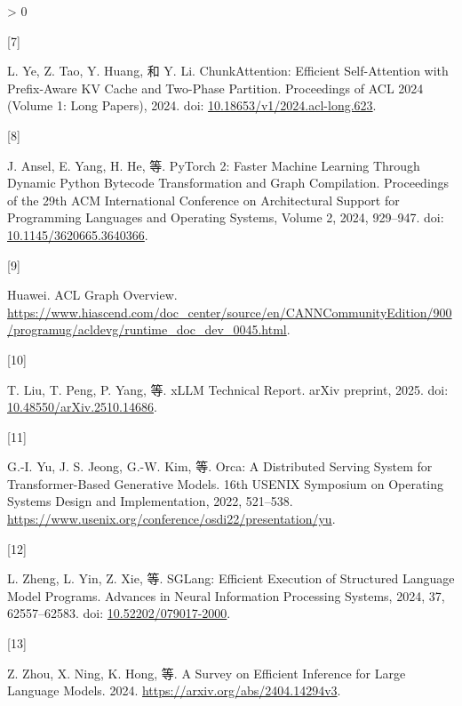 \documentclass[
  UTF8,
  zihao=5]{ctexart}
\newlength{\cslhangindent}
\newlength{\csllabelwidth}
\newenvironment{CSLReferences}[2] %
 {%
  \setlength{\parindent}{0pt}
  \ifodd #1 \everypar{\setlength{\hangindent}{\cslhangindent}}\ignorespaces\fi
  \ifnum #2 > 0
  \setlength{\parskip}{#2\baselineskip}
  \fi
 }%
 {}
\newcommand{\CSLLeftMargin}[1]{\parbox[t]{\csllabelwidth}{#1}}
\newcommand{\CSLRightInline}[1]{\parbox[t]{\linewidth - \csllabelwidth}{#1}\par}
\begin{document}
\begin{CSLReferences}{0}{0}
\leavevmode{}%
\CSLLeftMargin{{[}7{]} }%
\CSLRightInline{L. Ye, Z. Tao, Y. Huang, 和 Y. Li. ChunkAttention:
Efficient Self-Attention with Prefix-Aware KV Cache and Two-Phase
Partition. Proceedings of ACL 2024 (Volume 1: Long Papers), 2024. doi:
\href{https://doi.org/10.18653/v1/2024.acl-long.623}{10.18653/v1/2024.acl-long.623}.}

\leavevmode{}%
\CSLLeftMargin{{[}8{]} }%
\CSLRightInline{J. Ansel, E. Yang, H. He, 等. PyTorch 2: Faster Machine
Learning Through Dynamic Python Bytecode Transformation and Graph
Compilation. Proceedings of the 29th ACM International Conference on
Architectural Support for Programming Languages and Operating Systems,
Volume 2, 2024, 929--947. doi:
\href{https://doi.org/10.1145/3620665.3640366}{10.1145/3620665.3640366}.}

\leavevmode{}%
\CSLLeftMargin{{[}9{]} }%
\CSLRightInline{Huawei. {ACL Graph Overview}.
\url{https://www.hiascend.com/doc_center/source/en/CANNCommunityEdition/900/programug/acldevg/runtime_doc_dev_0045.html}.}

\leavevmode{}%
\CSLLeftMargin{{[}10{]} }%
\CSLRightInline{T. Liu, T. Peng, P. Yang, 等. {xLLM Technical Report}.
arXiv preprint, 2025. doi:
\href{https://doi.org/10.48550/arXiv.2510.14686}{10.48550/arXiv.2510.14686}.}

\leavevmode{}%
\CSLLeftMargin{{[}11{]} }%
\CSLRightInline{G.-I. Yu, J. S. Jeong, G.-W. Kim, 等. {Orca: A
Distributed Serving System for Transformer-Based Generative Models}.
16th USENIX Symposium on Operating Systems Design and Implementation,
2022, 521--538.
\url{https://www.usenix.org/conference/osdi22/presentation/yu}.}

\leavevmode{}%
\CSLLeftMargin{{[}12{]} }%
\CSLRightInline{L. Zheng, L. Yin, Z. Xie, 等. {SGLang: Efficient
Execution of Structured Language Model Programs}. Advances in Neural
Information Processing Systems, 2024, 37, 62557--62583. doi:
\href{https://doi.org/10.52202/079017-2000}{10.52202/079017-2000}.}

\leavevmode{}%
\CSLLeftMargin{{[}13{]} }%
\CSLRightInline{Z. Zhou, X. Ning, K. Hong, 等. A Survey on Efficient
Inference for Large Language Models. 2024.
\url{https://arxiv.org/abs/2404.14294v3}.}


\end{CSLReferences}
\end{document}
